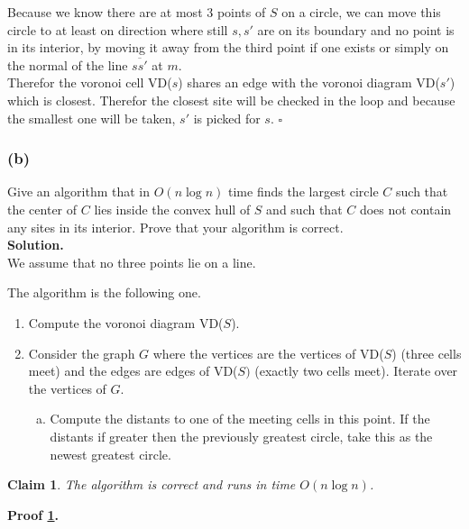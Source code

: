 \documentclass[11pt,a4paper,ngerman]{article}
\newtheorem{lemma}{\bfseries Claim}
\begin{document}
Because we know there are at most 3 points of $S$ on a circle, we can move this circle to at least on direction where
still $s,s'$ are on its boundary and no point is in its interior, by moving it away from the third point if one exists
or simply on the normal of the line $\overline{ss'}$ at $m$.\\
Therefor the voronoi cell VD($s$) shares an edge with the voronoi diagram VD($s'$) which is closest. Therefor
the closest site will be checked in the loop and because the smallest one will be taken, $s'$ is picked for $s$.
\mbox{} \hfill $\square$

\subsubsection*{(b)}

Give an algorithm that in $O(n \log n)$ time finds the largest circle $C$ such that the center of $C$ lies inside the convex hull of $S$ and such that $C$ does not contain any sites in its interior. Prove that your algorithm is correct.\\

\textbf{Solution.}\\

We assume that no three points lie on a line.

The algorithm is the following one.
\begin{enumerate}[1.]
    \item Compute the voronoi diagram VD($S$).
    \item Consider the graph $G$ where the vertices are the vertices of VD($S$) (three cells meet)
        and the edges are edges of VD($S)$ (exactly two cells meet). Iterate over the
        vertices of $G$.
        \begin{enumerate}[a.]
            \item Compute the distants to one of the meeting cells in this point. If the
                distants if greater then the previously greatest circle, take this as the newest
                greatest circle.
        \end{enumerate}
\end{enumerate}

\begin{lemma} \label{alge:ueb9:t4:cor}
    The algorithm is correct and runs in time $O(n \log n)$.
\end{lemma}

\textbf{Proof \ref{alge:ueb9:t4:cor}.}\\
\end{document}
